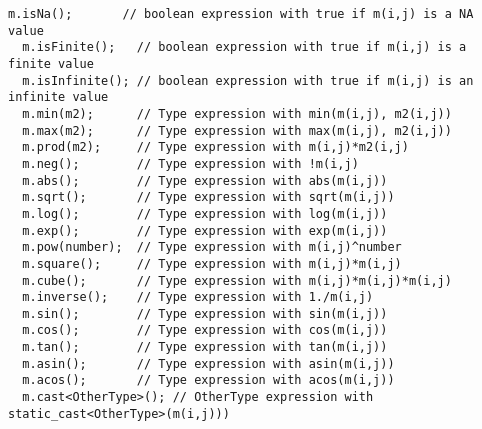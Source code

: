 \documentclass[a4paper,10pt]{article}
\begin{document}
\begin{lstlisting}[style=customcpp,caption=Miscellaneous functions]
  m.isNa();       // boolean expression with true if m(i,j) is a NA value
  m.isFinite();   // boolean expression with true if m(i,j) is a finite value
  m.isInfinite(); // boolean expression with true if m(i,j) is an infinite value
  m.min(m2);      // Type expression with min(m(i,j), m2(i,j))
  m.max(m2);      // Type expression with max(m(i,j), m2(i,j))
  m.prod(m2);     // Type expression with m(i,j)*m2(i,j)
  m.neg();        // Type expression with !m(i,j)
  m.abs();        // Type expression with abs(m(i,j))
  m.sqrt();       // Type expression with sqrt(m(i,j))
  m.log();        // Type expression with log(m(i,j))
  m.exp();        // Type expression with exp(m(i,j))
  m.pow(number);  // Type expression with m(i,j)^number
  m.square();     // Type expression with m(i,j)*m(i,j)
  m.cube();       // Type expression with m(i,j)*m(i,j)*m(i,j)
  m.inverse();    // Type expression with 1./m(i,j)
  m.sin();        // Type expression with sin(m(i,j))
  m.cos();        // Type expression with cos(m(i,j))
  m.tan();        // Type expression with tan(m(i,j))
  m.asin();       // Type expression with asin(m(i,j))
  m.acos();       // Type expression with acos(m(i,j))
  m.cast<OtherType>(); // OtherType expression with static_cast<OtherType>(m(i,j)))
\end{lstlisting}



%
%
\end{document}
